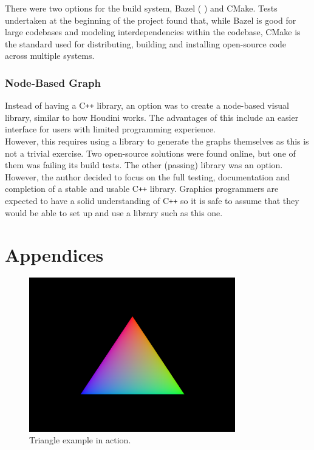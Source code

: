 \documentclass[12pt]{report}
\newcommand{\citebu}[1]{(\citenoparen{#1})}
\newcommand{\citenoparen}[1]{\citeauthor{#1} \citeyear{#1}}
\newcommand{\cpp}{C\texttt{++}}
\theoremstyle{definition}
\begin{document}
      There were two options for the build system, Bazel \citebu{bazel} and CMake.
      Tests undertaken at the beginning of the
      project found that, while Bazel is good for large codebases and
      modeling interdependencies within the codebase, CMake is the
      standard used for distributing, building and installing
      open-source code across multiple systems.

    \subsection{Node-Based Graph}

      Instead of having a \cpp{} library, an option was to create a node-based visual
      library, similar to how Houdini works. The advantages of this include an
      easier interface for users with limited programming experience. \\

      However, this requires using a library to generate the graphs themselves
      as this is not a trivial exercise. Two open-source solutions were
      found online, but one of them was failing its build tests. The
      other (passing) library was an option. However, the author
      decided to focus on the full testing, documentation and
      completion of a stable and usable \cpp{} library. Graphics
      programmers are expected to have a solid understanding
      of \cpp{} so it is safe to assume that they would be able
      to set up and use a library such as this one.

  
  

  \chapter*{Appendices}

      \begin{figure}[h]
        \centering
        \includegraphics[width=0.8\textwidth]{images/triangle_example.png}
        \caption{Triangle example in action.}
        \label{fig:triangle_example}  
      \end{figure}
\end{document}
